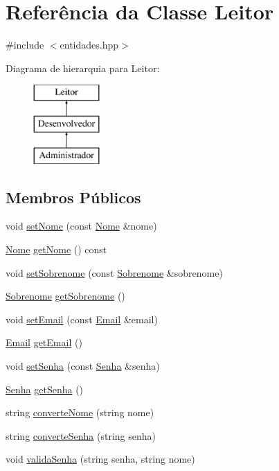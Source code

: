 \hypertarget{class_leitor}{}\section{Referência da Classe Leitor}
\label{class_leitor}


{\ttfamily \#include $<$entidades.\+hpp$>$}

Diagrama de hierarquia para Leitor\+:\begin{figure}[H]
\begin{center}
\leavevmode
\includegraphics[height=3.000000cm]{class_leitor}
\end{center}
\end{figure}
\subsection*{Membros Públicos}
\begin{DoxyCompactItemize}
\item 
void \mbox{\hyperlink{class_leitor_a2698f4915451a7a53985b8cd275f4ae1}{set\+Nome}} (const \mbox{\hyperlink{class_nome}{Nome}} \&nome)
\item 
\mbox{\hyperlink{class_nome}{Nome}} \mbox{\hyperlink{class_leitor_af12cee66e7318fcbb6a0e407a40fb902}{get\+Nome}} () const
\item 
void \mbox{\hyperlink{class_leitor_affdb7e753343758607242d67dcda033b}{set\+Sobrenome}} (const \mbox{\hyperlink{class_sobrenome}{Sobrenome}} \&sobrenome)
\item 
\mbox{\hyperlink{class_sobrenome}{Sobrenome}} \mbox{\hyperlink{class_leitor_ad8cf5a7cedecd12d087f7dde668c724a}{get\+Sobrenome}} ()
\item 
void \mbox{\hyperlink{class_leitor_adc476ba94b63efc6416c22989e55e7e0}{set\+Email}} (const \mbox{\hyperlink{class_email}{Email}} \&email)
\item 
\mbox{\hyperlink{class_email}{Email}} \mbox{\hyperlink{class_leitor_ae6cd620931ae336b9d9afa4f83944fc1}{get\+Email}} ()
\item 
void \mbox{\hyperlink{class_leitor_a6ddd3a32947bf14f52f1794b5e2d552f}{set\+Senha}} (const \mbox{\hyperlink{class_senha}{Senha}} \&senha)
\item 
\mbox{\hyperlink{class_senha}{Senha}} \mbox{\hyperlink{class_leitor_ae9e88af5c4f0db47e6c19040f7281f2a}{get\+Senha}} ()
\item 
string \mbox{\hyperlink{class_leitor_a013a50e7e5d471efe31ce4f612b7399d}{converte\+Nome}} (string nome)
\item 
string \mbox{\hyperlink{class_leitor_ad18d27138f12d31c4d7d3b011b7d1579}{converte\+Senha}} (string senha)
\item 
void \mbox{\hyperlink{class_leitor_ab3d322a25d04ea7c6b8daf0d1bf0d85f}{valida\+Senha}} (string senha, string nome)
\end{DoxyCompactItemize}


